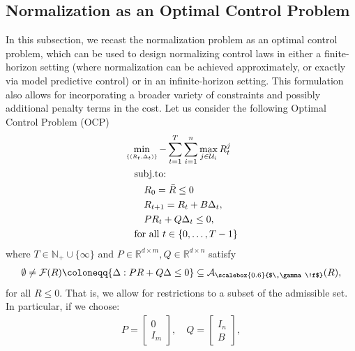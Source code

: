 \documentclass[10pt,leqno]{amsart}
\newcommand{\sml}{\scriptscriptstyle}
\newcommand{\R}{\mathbb{R}}
\newcommand{\N}{\mathbb{N}}
\newcommand{\U}{\mathcal{U}}
\newcommand{\Cost}{R}
\newcommand{\f}{f}
\newcommand{\disc}{\gamma}
\newcommand{\feasset}[1]{\mathcal{A}_{\scalebox{0.6}{$\,\disc\!\f$}}(#1)}
\begin{document}
\subsection{Normalization as an Optimal Control Problem}
\label{subsec:section_2C}
In this subsection, we recast the normalization problem as an optimal control problem, which can be used to design normalizing control laws in either a finite-horizon setting (where normalization can be achieved approximately, or exactly via model predictive control) or in an infinite-horizon setting. This formulation also allows for incorporating a broader variety of constraints and possibly additional penalty terms in the cost. 
%
Let us consider the following Optimal Control Problem (OCP)
\begin{subequations}\label{eq:ideal_optimal_control_problem}
    \begin{align}
        &\min_{\sml \{(\Cost_t, \Delta_t)\}} -\sum_{t = 1}^T \sum_{i = 1}^n \max_{j \in \U_i} \Cost_t^j \\\notag
        &\quad\text{subj.to:}\\
        &\qquad \Cost_0 = \bar{\Cost} \leq 0\\
        &\qquad \Cost_{t+1} = \Cost_t + B \Delta_t,\\
        &\qquad P \Cost_t + Q \Delta_t \leq 0,\label{eq:general_feas_constraint}\\
        &\quad\text{for all } t \in \{0, \hdots, T-1\}\notag
    \end{align}
\end{subequations}
where $T \in \N_+ \cup \{\infty\}$ and $P \in \R^{d\times m}, Q \in \R^{d\times n}$ satisfy
\begin{align}\label{eq:feasibility_of_general_constraint}
    \emptyset \neq \mathcal{F}(\Cost) \coloneqq \{\Delta : P \Cost + Q \Delta \leq 0\} \subseteq \feasset{\Cost},
\end{align}
for all $\Cost \leq 0$. That is, we allow for restrictions to a subset of the admissible set. In particular, if we choose:
\begin{align}\label{eq:ideal_constraint_choice}
    P = 
    \begin{bmatrix}
        0\\
        I_m
    \end{bmatrix}, 
    \quad 
    Q = 
    \begin{bmatrix}
        I_n\\
        B
    \end{bmatrix},
\end{align}
\end{document}
